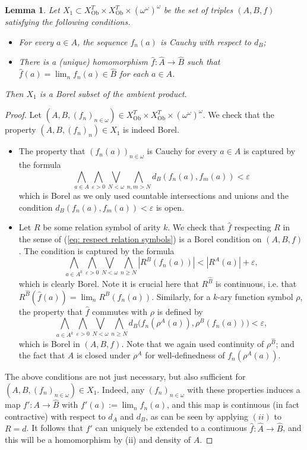 \documentclass[12pt]{amsart}
\newtheorem{lemma}[theorem]{Lemma}
\DeclareMathOperator{\Ob}{Ob}
\newcommand{\theory}{T}
\begin{document}
\begin{lemma}\label{lemma: Cauchy sequences X_1 Borel}
    Let $X_1 \subset X^{\theory}_{\Ob} \times X^{\theory}_{\Ob} \times (\omega^\omega)^\omega$ be the set of triples $(A,B,f)$ satisfying the following conditions.
    \begin{itemize}
        \item[(i)] For every $a \in A$, the sequence $f_n(a)$ is Cauchy with respect to $d_B$;
        \item[(ii)] There is a (unique) homomorphism $\widehat{f} \colon \widehat{A} \to \widehat{B}$ such that $\widehat{f}(a)=\lim_n f_n(a)\in \widehat{B}$ for each $a\in A$.
    \end{itemize}
    Then $X_1$ is a Borel subset of the ambient product. 
\end{lemma}
\begin{proof}
     Let $(A,B,(f_n)_{n\in\omega})\in X^{\theory}_{\Ob}\times X^{\theory}_{\Ob}\times {(\omega^\omega)}^{\omega}$. We check that the property $(A,B,(f_n)_n)\in X_1$ is indeed Borel.
    \begin{itemize}
        \item[(i)] The property that $(f_n(a))_{n\in\omega}$ is Cauchy for every $a\in A$ is captured by the formula
        \[ \bigwedge_{a\in A}\bigwedge_{\varepsilon >0} \bigvee_{N<\omega} \bigwedge_{n,m > N} d_B(f_n(a),f_m(a)) < \varepsilon \]
        which is Borel as we only used countable intersections and unions and the condition $d_B(f_n(a),f_m(a))<\varepsilon$ is open. 
        \item[(ii)] Let $R$ be some relation symbol of arity $k$. We check that $\widehat{f}$ respecting $R$ in the sense of (\ref{eq: respect relation symbols}) is a Borel condition on $(A,B,f)$. The condition is captured by the formula
        \[ \bigwedge_{a\in A^k} \bigwedge_{\varepsilon > 0}\bigvee_{N<\omega}\bigwedge_{n\geq N} |R^B(f_n(a))|<|R^A(a)|+\varepsilon, \]
        which is clearly Borel. Note it is crucial here that $R^{\widehat{B}}$ is continuous, i.e. that $R^{\widehat{B}}(\widehat{f}(a))=\lim_n R^B(f_n(a))$. Similarly, for a $k$-ary function symbol $\rho$, the property that $\widehat{f}$ commutes with $\rho$ is defined by
        \[\bigwedge_{a\in A^k}\bigwedge_{\varepsilon > 0}\bigvee_{N<\omega}\bigwedge_{n\geq N} d_B\big(f_n(\rho^A(a)),\rho^B(f_n(a))\big)<\varepsilon,\]
        which is Borel in $(A,B,f)$.
        Note that we again used continuity of $\rho^{\widehat{B}}$; and the fact that $A$ is closed under $\rho^A$ for well-definedness of $f_n(\rho^A(a))$.
    \end{itemize}
    The above conditions are not just necessary, but also sufficient for $(A,B,(f_n)_{n\in\omega})\in X_1$. Indeed, any $(f_n)_{n\in\omega}$ with these properties induces a map $f' \colon A\to\widehat{B}$ with $f'(a):=\lim_n f_n(a)$, and this map is continuous (in fact contractive) with respect to $d_A$ and $d_B$, as can be seen by applying $(ii)$ to $R=d$. It follows that $f'$ can uniquely be extended to a continuous $\widehat{f} \colon \widehat{A}\to\widehat{B}$, and this will be a homomorphism by (ii) and density of $A$.
\end{proof}
\end{document}
